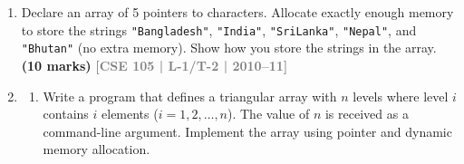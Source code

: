 \documentclass[12pt,a3paper]{article}
\newcommand{\yr}[1]{\hfill\textcolor{gray}{\small\textbf{[#1]}}}
\newcommand{\mk}[1]{\textcolor{orange!70!black}{\small\textbf{(#1 marks)}}}
\begin{document}
\begin{enumerate}
\item Declare an array of 5 pointers to characters. Allocate exactly enough memory to store the strings \texttt{"Bangladesh"}, \texttt{"India"}, \texttt{"SriLanka"}, \texttt{"Nepal"}, and \texttt{"Bhutan"} (no extra memory). Show how you store the strings in the array.
\mk{10} \yr{CSE 105 | L-1/T-2 | 2010--11}

\item
\begin{enumerate}
  \item Write a program that defines a triangular array with $n$ levels where level $i$ contains $i$ elements ($i = 1, 2, \ldots, n$). The value of $n$ is received as a command-line argument. Implement the array using pointer and dynamic memory allocation.
\begin{center}
\end{center}
\end{enumerate}
\end{enumerate}
\end{document}
